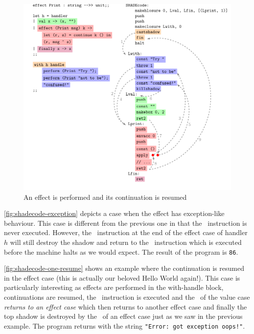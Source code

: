 \documentclass[class=article, crop=false]{standalone}
\begin{document}
\begin{figure}[htb]
    \centering
    \includegraphics[height=.45\textheight]{../figures/impl-one-resume.pdf}
    
    \caption{An effect is performed and its continuation is resumed}
    \label{fig:shadecode-one-resume}
\end{figure}

\autoref{fig:shadecode-exception} depicts a case when the effect has
exception-like behaviour. This case is different from the previous one in that
the \vmKillShadow\ instruction is never executed. However, the \vmRett\
instruction at the end of the effect case of handler $h$ will still destroy the
shadow and return to the \vmFin\ instruction which is executed before the
machine halts as we would expect. The result of the program is \lstinline|86|.

\autoref{fig:shadecode-one-resume} shows an example where the continuation is
resumed in the effect case (this is actually our beloved Hello World again!).
This case is particularly interesting as effects are performed in the
with-handle block, continuations are resumed, the \vmKillShadow\ instruction is
executed and the \vmRett\ of the value case \emph{returns to an effect case}
which then returns to another effect case and finally the top shadow is
destroyed by the \vmRett\ of an effect case just as we saw in the previous
example. The program returns with the string
\lstinline|"Error: got exception oops!"|.
\end{document}

